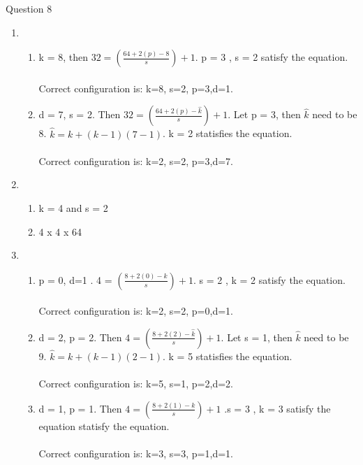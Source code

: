 \documentclass{article}
\begin{document}
\vspace{1cm}
 Question 8\\
	
  \begin{enumerate}
	\item
	  \begin{enumerate}
		\item
		k = 8, then $ 32 = (\frac{64 + 2(p) - 8}{s}) + 1$. p = 3 , s = 2 satisfy the equation.\\ \\
		Correct configuration is: k=8, s=2, p=3,d=1.
		\item
		d = 7, s = 2. Then $ 32 = (\frac{64 + 2(p) - \hat{k}}{s}) + 1$. Let p = 3, then $\hat{k}$ need to be 8. $\hat{k}= k + (k-1)(7-1)$. k = 2 statisfies the equation.\\ \\
		Correct configuration is: k=2, s=2, p=3,d=7.
	\end{enumerate}

	\item
	  \begin{enumerate}
	\item
	k = 4 and s = 2
	\item
	4 x 4 x 64
	 \end{enumerate}
	\item
	 \begin{enumerate}
	\item
	p = 0, d=1 . 4 = $(\frac{8 + 2(0) - k}{s}) + 1$. s = 2 , k = 2 satisfy the equation. \\ \\
	Correct configuration is: k=2, s=2, p=0,d=1.
	
	\item
	d = 2, p = 2. Then $ 4 = (\frac{8 + 2(2) - \hat{k}}{s}) + 1$. Let s = 1, then $\hat{k}$ need to be 9. $\hat{k}= k + (k-1)(2-1)$. k = 5 statisfies the equation.\\ \\
	Correct configuration is: k=5, s=1, p=2,d=2.

	\item
	d = 1, p = 1. Then $ 4 = (\frac{8 + 2(1) - k}{s}) + 1$ .s = 3 , k = 3 satisfy the equation statisfy the equation.\\ \\
	Correct configuration is: k=3, s=3, p=1,d=1.


	 \end{enumerate}
\end{enumerate}
\end{document}

